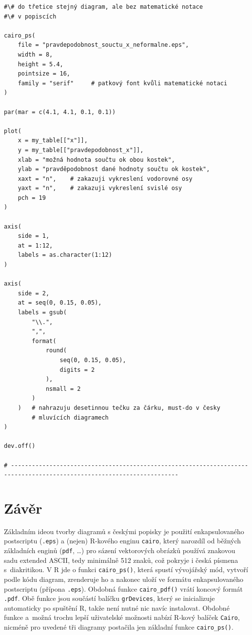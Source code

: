 \documentclass{article}
\begin{document}
\begin{lstlisting}[style = custom_R]
#\# do třetice stejný diagram, ale bez matematické notace
#\# v popiscích

cairo_ps(
    file = "pravdepodobnost_souctu_x_neformalne.eps",
    width = 8,
    height = 5.4,
    pointsize = 16,
    family = "serif"     # patkový font kvůli matematické notaci
)

par(mar = c(4.1, 4.1, 0.1, 0.1))

plot(
    x = my_table[["x"]],
    y = my_table[["pravdepodobnost_x"]],
    xlab = "možná hodnota součtu ok obou kostek",
    ylab = "pravděpodobnost dané hodnoty součtu ok kostek",
    xaxt = "n",    # zakazuji vykreslení vodorovné osy
    yaxt = "n",    # zakazuji vykreslení svislé osy
    pch = 19
)

axis(
    side = 1,
    at = 1:12,
    labels = as.character(1:12)
)

axis(
    side = 2,
    at = seq(0, 0.15, 0.05),
    labels = gsub(
        "\\.",
        ",",
        format(
            round(
                seq(0, 0.15, 0.05),
                digits = 2
            ),
            nsmall = 2
        )
    )   # nahrazuju desetinnou tečku za čárku, must-do v česky
        # mluvících diagramech
)

dev.off()

# ----------------------------------------------------------------------------------------------------------------------
\end{lstlisting}

\section{Závěr}

Základním ideou tvorby diagramů s českými popisky je použití
enkapsulovaného postscriptu (\texttt{.eps}) a (nejen) \textsf{R}-kového
enginu \texttt{cairo}, který narozdíl od běžných základních enginů
(\texttt{pdf}, \ldots)
pro sázení vektorových obrázků používá znakovou sadu extended ASCII,
tedy minimálně 512 znaků, což pokryje i česká písmena s~diakritikou.
V \textsf{R} jde o funkci \texttt{cairo\_ps()}, která spustí vývojářský
mód, vytvoří podle kódu diagram, zrenderuje ho a nakonec uloží ve formátu
enkapsulovaného postscriptu (přípona \texttt{.eps}).
Obdobná funkce \texttt{cairo\_pdf()} vrátí koncový formát \texttt{.pdf}.
Obě funkce jsou součástí balíčku \texttt{grDevices}, který se inicializuje
automaticky po spuštění \textsf{R}, takže není nutné nic navíc instalovat.
Obdobné funkce a~možná trochu lepší uživatelské možnosti nabízí \textsf{R}-kový
balíček
\texttt{Cairo}, nicméně pro uvedené tři diagramy postačila jen základní
funkce \texttt{cairo\_ps()}.
\end{document}
